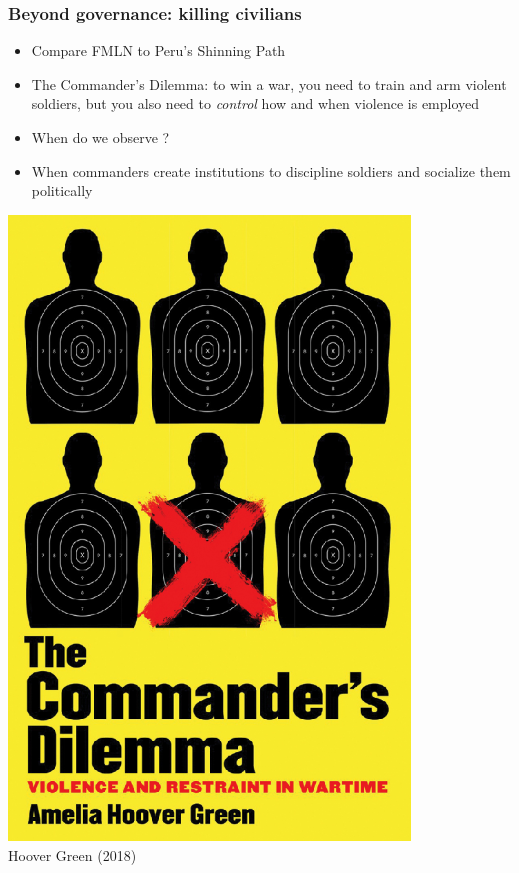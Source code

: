 \documentclass[aspectratio=43]{beamer}
\begin{document}
\begin{frame}
\frametitle{Beyond governance: killing civilians}
\centering

\begin{minipage}{.64\textwidth}\centering
\begin{itemize}
  \item<1-> Compare FMLN to Peru's Shinning Path
  \item<2-> The Commander's Dilemma: to win a war, you need to train and arm violent soldiers, but you also need to \textit{control} how and when violence is employed
  \item<2-> When do we observe ?
  \item<3-> When commanders create institutions to discipline soldiers and socialize them politically
\end{itemize}
\end{minipage}\hfill
\begin{minipage}{.34\textwidth}\centering
\includegraphics[width = 0.8\textwidth]{img/hoover_green}\\Hoover Green (2018)
\end{minipage}

\end{frame}
\end{document}

